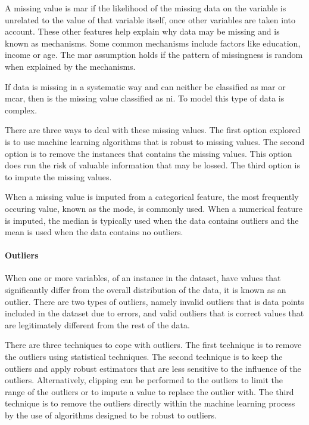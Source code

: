 \documentclass[10pt, conference]{IEEEtran}
\begin{document}
A missing value is \acrshort{mar} if the likelihood of the missing data on the variable is unrelated to the value of
that variable itself, once other variables are taken into account. These other features help explain why data may
be missing and is known as mechanisms. Some common mechanisms include factors like education, income or age.
The \acrshort{mar} assumption holds if the pattern of missingness is random when explained by the mechanisms.

If data is missing in a systematic way and can neither be classified as \acrshort{mar} or \acrshort{mcar}, then
is the missing value classified as \acrshort{ni}. To model this type of data is complex.

There are three ways to deal with these missing values. The first option explored is to use machine learning
algorithms that is robust to missing values. The second option is to remove the instances that contains the
missing values. This option does run the risk of valuable information that may be lossed. The third option
is to impute the missing values.

When a missing value is imputed from a categorical feature, the most frequently occuring value, known as the mode,
is commonly used. When a numerical feature is imputed, the median is typically used when the data contains outliers
and the mean is used when the data contains no outliers. 

\paragraph{Outliers}

When one or more variables, of an instance in the dataset, have values that significantly differ from the overall distribution
of the data, it is known as an outlier. There are two types of outliers, namely invalid outliers that is data points included
in the dataset due to errors, and valid outliers that is correct values that are legitimately different from the rest
of the data.

There are three techniques to cope with outliers. The first technique is to remove the outliers using statistical
techniques. The second technique is to keep the outliers and apply robust estimators that are less sensitive to the
influence of the outliers. Alternatively, clipping can be performed to the outliers to limit the range of the outliers
or to impute a value to replace the outlier with. The third technique is to remove the outliers directly within the
machine learning process by the use of algorithms designed to be robust to outliers.
\end{document}
